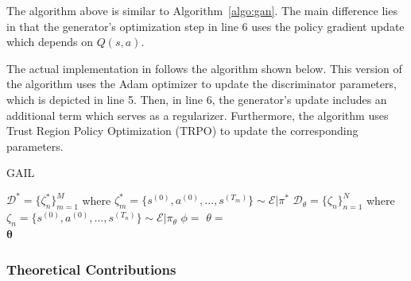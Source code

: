 \documentclass[11pt]{article}
\begin{document}
The algorithm above is similar to Algorithm~\ref{algo:gan}. The main difference lies in that the generator's optimization step in line 6 uses the policy gradient update which depends on $Q(s, a)$. 

The actual implementation in \cite{ho2016gail} follows the algorithm shown below. This version of the algorithm uses the Adam optimizer \cite{diederik2014adam} to update the discriminator parameters, which is depicted in line 5. Then, in line 6, the generator's update includes an additional term  which serves as a regularizer. Furthermore, the algorithm uses Trust Region Policy Optimization (TRPO) \cite{schulman2015trpo} to update the corresponding parameters.

\begin{algorithm}[H]
    \label{algo:gail_lambda}
    \caption{GAIL}
    \begin{algorithmic}[1]
    \State $\mathcal{D}^\ast = \{ \zeta^\ast_n\}_{m=1}^M$ where $\zeta_m^\ast = \{ s^{(0)}, a^{(0)}, \dots, s^{(T_m)} \} \sim \mathcal{E} | \pi^\ast$ 
    \State $\mathcal{D}_\theta = \{ \zeta_n\}_{n=1}^N$ where $\zeta_n = \{s^{(0)}, a^{(0)}, \dots, s^{(T_n)} \} \sim \mathcal{E} | \pi_\theta$
    \State $\phi = $ 
    \State $\theta = $ 
    \EndFor \\
    \Return $\boldsymbol{\theta}$
    \EndFunction
    \end{algorithmic}
\end{algorithm}

\subsubsection{Theoretical Contributions}
\end{document}
